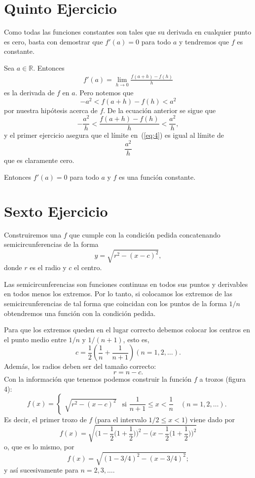 \documentclass[fleqn,leqno,10pt,letterpaper,final]{article}
\begin{document}
\section{Quinto Ejercicio}%
Como todas las funciones constantes son tales que su derivada en cualquier punto es cero,
basta con demostrar que $f'(a)=0$ para todo $a$ y tendremos que $f$ es constante.

Sea $a\in\mathbb{R}$. Entonces
\begin{align}\label{eq:4}
	f'(a)= \lim_{h\to 0} \frac{f(a+h)-f(h)}{h} 
\end{align}
es la derivada de $f$ en $a$. Pero notemos que
\[
	-a^2<f(a+h)-f(h)<a^2
\]
por nuestra hipótesis acerca de $f$. De la ecuación anterior se sigue que
\[
	-\frac{a^2}{h}< \frac{f(a+h)-f(h)}{h}< \frac{a^2}{h},
\]
y el primer ejercicio asegura que el límite en~(\ref{eq:4}) es igual al límite de
\[
	\frac{a^2}{h} 
\]
que es claramente cero.

Entonces $f'(a)=0$ para todo $a$ y $f$ es una función constante.

\section{Sexto Ejercicio}%
Construiremos una $f$ que cumple con la condición pedida concatenando
semicircunferencias de la forma
\[
	y=\sqrt{r^2-(x-c)^2},
\] 
donde $r$ es el radio y $c$ el centro.

Las semicircunferencias son funciones continuas 
en todos sus puntos y derivables en todos menos los extremos. Por lo tanto,
si colocamos los extremos de las semicircunferencias de tal forma
que coincidan con los puntos de la forma $1/n$ obtendremos
una función con la condición pedida.
%

Para que los extremos queden en el lugar correcto debemos
colocar los centros en el punto medio entre $1/n$ y $1/(n+1)$,
esto es,
\[
	c= \frac{1}{2} \left( \frac{1}{n} + \frac{1}{n+1} \right) (n=1,2,\dots).
\]
Además, los radios deben ser del tamaño correcto:
\[
	r=n-c.
\]
Con la información que tenemos podemos construir la función
$f$ a trozos (figura 4):
\[
	f(x)= \begin{cases}
		\sqrt{r^2-(x-c)^2} &\text{si $\dfrac{1}{n+1}\leq x< \dfrac 1n $}\quad (n=1,2,\dots).
	\end{cases}
\]
Es decir, el primer trozo de $f$ (para el intervalo $1/2\leq x<1$) viene dado por
\[
	f(x)=\sqrt{\biggl(1- \frac{1}{2}\bigl(1+ \frac{1}{2}\bigr)\biggr)^2 - 	\biggl(x-\frac{1}{2}\bigl(1+ \frac{1}{2}\bigr)\biggr)^2}
\]
o, que es lo mismo, por
\[
	f(x)=\sqrt{(1-3/4)^2-(x-3/4)^2};
\]
y así sucesivamente para $n=2,3,\dots$.%
\end{document}

